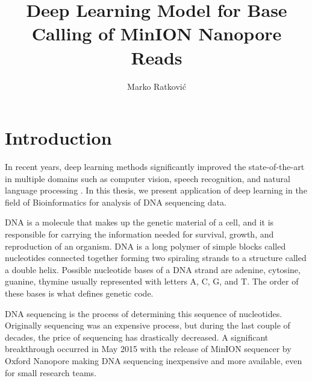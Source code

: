 \documentclass[times, utf8, diplomski, numeric, english]{fer}
\begin{document}
\title{Deep Learning Model for Base Calling of MinION Nanopore Reads}
\author{Marko Ratković}

\maketitle

\izvornik


\tableofcontents
\listoffigures
\listoftables

\chapter{Introduction}

In recent years,  deep learning methods significantly improved the state-of-the-art in multiple domains such as computer vision, speech recognition, and natural language processing \cite{LeCun:1998:CNI:303568.303704}\cite{NIPS2012_4824}. 
In this thesis, we present application of deep learning in the field of  Bioinformatics for analysis of DNA sequencing data. 

DNA is a molecule that makes up the genetic material of a cell, and it is responsible for carrying the information needed for survival, growth, and reproduction of an organism. 
DNA is a long polymer of simple blocks called nucleotides connected together forming two spiraling strands to a structure called a double helix.  Possible nucleotide bases of a DNA strand are adenine, cytosine, guanine, thymine usually represented with letters A, C, G, and T. The order of these bases is what defines genetic code.

DNA sequencing is the process of determining this sequence of nucleotides. Originally sequencing was an expensive process, but during the last couple of decades, the price of sequencing has drastically decreased.  A significant breakthrough occurred in May 2015 with the release of MinION sequencer by Oxford Nanopore making DNA sequencing inexpensive and more available, even for small research teams. 
\end{document}
